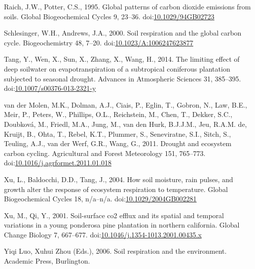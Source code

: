\documentclass[]{elsarticle} %
\begin{document}
\leavevmode\hypertarget{ref-Raich.1995}{}%
Raich, J.W., Potter, C.S., 1995. Global patterns of carbon dioxide
emissions from soils. Global Biogeochemical Cycles 9, 23--36.
doi:\href{https://doi.org/10.1029/94GB02723}{10.1029/94GB02723}

\leavevmode\hypertarget{ref-Schlesinger.2000}{}%
Schlesinger, W.H., Andrews, J.A., 2000. Soil respiration and the global
carbon cycle. Biogeochemistry 48, 7--20.
doi:\href{https://doi.org/10.1023/A:1006247623877}{10.1023/A:1006247623877}

\leavevmode\hypertarget{ref-Tang.2014}{}%
Tang, Y., Wen, X., Sun, X., Zhang, X., Wang, H., 2014. The limiting
effect of deep soilwater on evapotranspiration of a subtropical
coniferous plantation subjected to seasonal drought. Advances in
Atmospheric Sciences 31, 385--395.
doi:\href{https://doi.org/10.1007/s00376-013-2321-y}{10.1007/s00376-013-2321-y}

\leavevmode\hypertarget{ref-vanderMolen.2011}{}%
van der Molen, M.K., Dolman, A.J., Ciais, P., Eglin, T., Gobron, N.,
Law, B.E., Meir, P., Peters, W., Phillips, O.L., Reichstein, M., Chen,
T., Dekker, S.C., Doubková, M., Friedl, M.A., Jung, M., van den Hurk,
B.J.J.M., Jeu, R.A.M. de, Kruijt, B., Ohta, T., Rebel, K.T., Plummer,
S., Seneviratne, S.I., Sitch, S., Teuling, A.J., van der Werf, G.R.,
Wang, G., 2011. Drought and ecosystem carbon cycling. Agricultural and
Forest Meteorology 151, 765--773.
doi:\href{https://doi.org/10.1016/j.agrformet.2011.01.018}{10.1016/j.agrformet.2011.01.018}

\leavevmode\hypertarget{ref-Xu.2004}{}%
Xu, L., Baldocchi, D.D., Tang, J., 2004. How soil moisture, rain pulses,
and growth alter the response of ecosystem respiration to temperature.
Global Biogeochemical Cycles 18, n/a--n/a.
doi:\href{https://doi.org/10.1029/2004GB002281}{10.1029/2004GB002281}

\leavevmode\hypertarget{ref-Xu.2001}{}%
Xu, M., Qi, Y., 2001. Soil-surface co2 efflux and its spatial and
temporal variations in a young ponderosa pine plantation in northern
california. Global Change Biology 7, 667--677.
doi:\href{https://doi.org/10.1046/j.1354-1013.2001.00435.x}{10.1046/j.1354-1013.2001.00435.x}

\leavevmode\hypertarget{ref-YiqiLuo.2006}{}%
Yiqi Luo, Xuhui Zhou (Eds.), 2006. Soil respiration and the environment.
Academic Press, Burlington.
\end{document}
